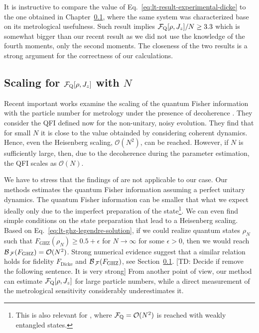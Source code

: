 It is instructive to compare the value of Eq.~\eqref{eq:lt-result-experimental-dicke} to the one obtained in Chapter~\ref{}, where the same system was characterized base on its metrological usefulness.
Such result implies $\mathcal{F}_{\textnormal{Q}}[\rho,J_z]/N\geq3.3$ which is somewhat bigger than our recent result as we did not use the knowledge of the fourth moments, only the second moments.
The closeness of the two results is a strong argument for the correctness of our calculations.

\subsection{Scaling for $\mathcal{F}_{\textnormal{Q}}[\rho,J_z]$ with $N$}

Recent important works examine the scaling of the quantum Fisher information with the particle number for metrology under the presence of decoherence \citep{Escher2011, Demkowicz2012}.
They consider the QFI defined now for the non-unitary, noisy evolution.
They find that for small $N$ it is close to the value obtainded by considering coherent dynamics.
Hence, even the Heisenberg scaling, $\mathcal{O}(N^2)$, can be reached.
However, if $N$ is sufficiently large, then, due to the decoherence during the parameter estimation, the QFI scales as $\mathcal{O}(N)$.

We have to stress that the findings of \citep{Escher2011, Demkowicz2012} are not applicable to our case.
Our methods estimates the quantum Fisher information assuming a perfect unitary dynamics.
The quantum Fisher information can be smaller that what we expect ideally only due to the imperfect preparation of the state\footnote{
This is also relevant for \citep{Augusiak2015}, where $\mathcal{F}_{\textnormal{Q}}=\mathcal{O}(N^2)$ is reached with weakly entangled states.}.
We can even find simple conditions on the state preparation that lead to a Heisenberg scaling.
Based on Eq.~\eqref{eq:lt-ghz-legendre-solution}, if we could realize quantum states $\rho_N$ such that $F_{\text{GHZ}}(\rho_N)\geq0.5+\epsilon$ for $N\rightarrow\infty$ for some $\epsilon>0$, then we would reach $\mathcal{B}_{\, \mathcal{F} }(F_{\text{GHZ}}) = \mathcal{O}(N^2)$.
Strong numerical evidence suggest that a similar relation holds for fidelity $F_{\text{Dicke}}$ and $\mathcal{B}_{\, \mathcal{F} }(F_{\text{GHZ}})$, see Section~\ref{}.
[TD: Decide if remove the following sentence. It is very strong]
From another point of view, our method can estimate $\mathcal{F}_{\textnormal{Q}}[\rho,J_z]$ for large particle numbers, while a direct measurement of the metrological sensitivity considerably underestimates it.
